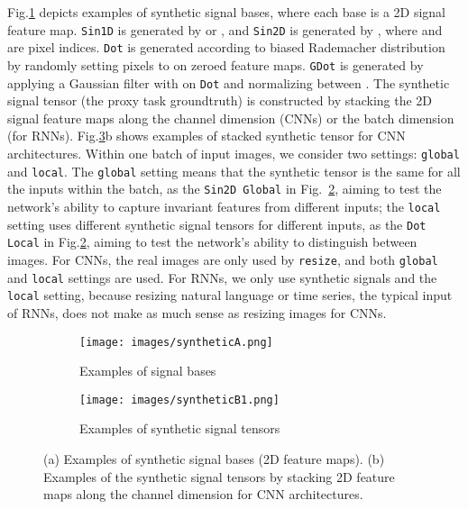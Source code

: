 \documentclass{article}
\begin{document}
Fig.\ref{fig:signalA} depicts examples of synthetic signal bases, where each base is a 2D signal feature map.
\texttt{Sin1D} is generated by  or , and
\texttt{Sin2D} is generated by ,
where  and  are pixel indices.
\texttt{Dot} is generated according to biased Rademacher distribution~\cite{montgomery1990distribution} by randomly setting  pixels to  on zeroed feature maps. 
\texttt{GDot} is generated by applying a Gaussian filter with  on \texttt{Dot} and normalizing between .
The synthetic signal tensor  (the proxy task groundtruth) is constructed by stacking the 2D signal feature maps along the channel dimension (CNNs) or the batch dimension (for RNNs).
Fig.\ref{fig:signals}b shows examples of stacked synthetic tensor  for CNN architectures.
Within one batch of input images, we consider two settings: \texttt{global} and \texttt{local}.
The \texttt{global} setting means that the synthetic tensor is the same for all the inputs within the batch, as the \texttt{Sin2D\,Global} in Fig.~\ref{fig:signalB}, aiming to test the network's ability to capture invariant features from different inputs; the \texttt{local} setting uses different synthetic signal tensors for different inputs, as the \texttt{Dot\,Local} in Fig.\ref{fig:signalB}, aiming to test the network's ability to distinguish between images.
For CNNs, the real images are only used by \texttt{resize}, and both \texttt{global} and \texttt{local} settings are used.
For RNNs, we only use synthetic signals and the \texttt{local} setting, because resizing natural language or time series, the typical input of RNNs, does not make as much sense as resizing images for CNNs. 

\begin{figure}
\vspace{-8pt}
     \centering
     \begin{subfigure}[b]{0.36\textwidth}
         \centering
         \texttt{[image: images/syntheticA.png]}
         \caption{Examples of signal bases}
         \label{fig:signalA}
     \end{subfigure}
     \hfill
     \begin{subfigure}[b]{0.61\textwidth}
         \centering
         \texttt{[image: images/syntheticB1.png]}
         \caption{Examples of synthetic signal tensors}
         \label{fig:signalB}
     \end{subfigure}
        \caption{(a) Examples of synthetic signal bases (2D feature maps). (b) Examples of the synthetic signal tensors by stacking 2D feature maps along the channel dimension for CNN architectures. }\label{fig:signals}
        \vspace{-8pt}
\end{figure}
\end{document}
